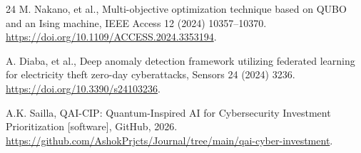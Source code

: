\documentclass[preprint,12pt]{elsarticle}
\begin{document}
\begin{thebibliography}{24}
 M. Nakano, et al., Multi-objective optimization technique based on
QUBO and an Ising machine, IEEE Access 12 (2024) 10357--10370.
\url{https://doi.org/10.1109/ACCESS.2024.3353194}.

 A. Diaba, et al., Deep anomaly detection framework utilizing
federated learning for electricity theft zero-day cyberattacks, Sensors 24 (2024) 3236.
\url{https://doi.org/10.3390/s24103236}.

 A.K. Sailla, QAI-CIP: Quantum-Inspired AI for Cybersecurity Investment
Prioritization [software], GitHub, 2026.
\url{https://github.com/AshokPrjcts/Journal/tree/main/qai-cyber-investment}.

\end{thebibliography}
\end{document}
